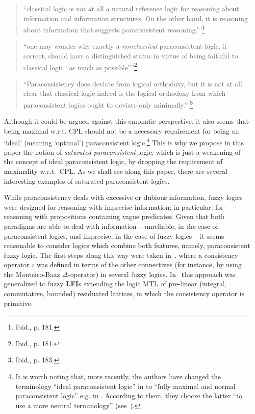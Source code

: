 \documentclass{article}
\theoremstyle{definition}
\begin{document}
\begin{quotation}
``classical logic is not at all a natural reference logic for reasoning
about information and information structures. On the other hand, it is reasoning about
information that suggests paraconsistent reasoning.'''\footnote{Ibid., p. 181.}
\end{quotation}


\begin{quotation}
``one may wonder why exactly a {\em nonclassical} paraconsistent logic, if correct, should have a distinguished
status in virtue of being faithful to classical logic ``as much as possible''.''\footnote{Ibid., p. 181.}
\end{quotation}


\begin{quotation}
``Paraconsistency does deviate from logical orthodoxy, but it is not at all clear that classical logic indeed is the logical orthodoxy from which paraconsistent logics ought to deviate only minimally.'''\footnote{Ibid., p. 183.}
\end{quotation}

Although it could be argued against this emphatic perspective, it also seems that being maximal w.r.t. CPL should not be a necessary requirement for being an `ideal' (meaning `optimal') paraconsistent logic.\footnote{It is worth noting that, more recently, the authors have changed the terminology ``ideal paraconsistent logic'' in \cite{ArieliAZ11a} to ``fully maximal and normal paraconsistent logic'' e.g. in \cite{AAZbook}. According to them, they choose the latter ``to use a more neutral terminology'' (see~\cite[Footnote~9, p.~57]{AAZbook}).} This is why we propose in this paper  the notion of {\em saturated paraconsistent} logic, which is just a weakening of the concept of ideal paraconsistent logic, by dropping the requirement of maximality w.r.t.\ CPL. As we shall see along this paper, there are several interesting examples of saturated paraconsistent logics.

While paraconsistency deals with excessive or dubious information,  fuzzy logics were designed for reasoning with imprecise information;
in particular, for reasoning with propositions containing vague predicates.
Given that  both paradigms are able to deal with information -- unreliable, in the case of paraconsistent logics, and imprecise, in the case of fuzzy logics -- it seems reasonable to consider logics which combine both features, namely,  paraconsistent fuzzy logic. The first steps along this way were taken in~\cite{EEFGN}, where a consistency operator $\circ$ was defined in terms of the other connectives (for instance, by using the Monteiro-Baaz $\Delta$-operator) in several fuzzy logics.
In~\cite{CoEsGo:14} this approach was generalized to fuzzy  {\bf LFI}s extending the logic MTL of pre-linear (integral, commutative, bounded) residuated lattices, in which the consistency operator is primitive.
\end{document}
